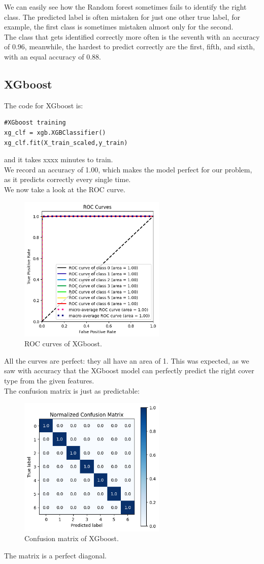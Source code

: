 \documentclass[letterpaper,12pt]{article}
\begin{document}
We can easily see how the Random forest sometimes fails to identify the right class. The predicted label is often mistaken for just one other true label, for example, the first class is sometimes mistaken almost only for the second.\\
The class that gets identified correctly more often is the seventh with an accuracy of 0.96, meanwhile, the hardest to predict correctly are the first, fifth, and sixth, with an equal accuracy of 0.88.

\subsection{XGboost}
The code for XGboost is:
\begin{lstlisting}
#XGboost training
xg_clf = xgb.XGBClassifier()
xg_clf.fit(X_train_scaled,y_train)
\end{lstlisting}
and it takes xxxx minutes to train.\\
We record an accuracy of 1.00, which makes the model perfect for our problem, as it predicts correctly every single time.\\
We now take a look at the ROC curve.
\begin{figure}[H]
    \centering
    \includegraphics[width=7cm]{ROCXG.png}
    \caption{\centering ROC curves of XGboost.}
    \label{cross}
\end{figure}
All the curves are perfect: they all have an area of 1. This was expected, as we saw with accuracy that the XGboost model can perfectly predict the right cover type from the given features.\\
The confusion matrix is just as predictable:
\begin{figure}[H]
    \centering
    \includegraphics[width=7cm]{CMatrXG.png}
    \caption{\centering Confusion matrix of XGboost.}
    \label{cross}
\end{figure}
The matrix is a perfect diagonal.
\end{document}

